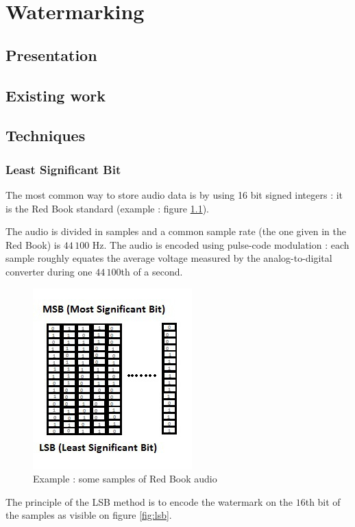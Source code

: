 \chapter{Watermarking}
\section{Presentation}
\section{Existing work}
\section{Techniques}
\subsection{Least Significant Bit}
The most common way to store audio data is by using 16 bit signed integers : it is the Red Book standard (example : figure \ref{fig:audio}).

The audio is divided in samples and a common sample rate (the one given in the Red Book) is $44\,100$ Hz. The audio is encoded using pulse-code modulation : each sample roughly equates the average voltage measured by the analog-to-digital converter during one $44\,100$th of a second.

\begin{figure}[h!]
\centering
\includegraphics{images/LSB1.jpg}
\caption{Example : some samples of Red Book audio}
\label{fig:audio}
\end{figure}


The principle of the \ac{LSB} method \cite{tirkel1993electronic} is to encode the watermark on the $16$th bit of the samples as visible on figure \ref{fig:lsb}.

